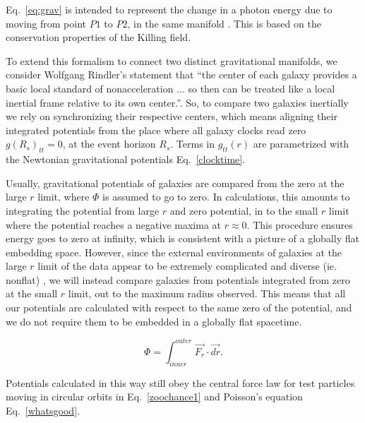 \documentclass[reprint,%
 amsmath,amssymb,
 aps,
]{revtex4-1}
\begin{document}
Eq.~\ref{eq:grav} is    intended to represent the change in a photon energy due to  moving from point $P1$ to $P2$,  in the same manifold \cite{Wald}.   This is based on the conservation properties of the Killing field. 


To  extend this formalism   to connect 
  two distinct gravitational manifolds, we consider  Wolfgang Rindler's statement that        ``the center of each galaxy provides a basic local standard of nonacceleration ... so then can be treated like a local inertial frame relative to its own center.''\cite{rindler2013essential}.
   So, to compare two   galaxies inertially  we rely on synchronizing their respective   centers, which means aligning their integrated potentials from the place where all galaxy clocks read zero   $g(R_s)_{tt} = 0$, at the event horizon $R_s$. 
   Terms in 
  $g_{tt}(r)$ are  parametrized with  the Newtonian  gravitational potentials   Eq.~\ref{clocktime}. 
  
 
   
 Usually, gravitational potentials of galaxies are compared from the zero at  the large $r$ limit,  where  $\Phi$ is assumed  to go to zero. 
 In calculations, this amounts to integrating the potential from large $r$ and  zero potential, in to the small $r$ limit where the potential reaches a negative maxima at   $r\approx 0$. 
This procedure  ensures   energy goes to zero at infinity, which is consistent with a picture of a globally flat embedding space.   However, since 
  the external environments of galaxies at the large $r$  limit of the data appear to be  extremely complicated  and diverse (ie. nonflat) \cite{Pomarede:2020pme,Hoffman:2017ako},   we will instead compare galaxies from potentials integrated from  zero at the   small $r$ limit, out to the maximum radius observed. This means that all our potentials are calculated with respect to the same zero of the potential, and we do not require them to be embedded in a globally flat spacetime.
   
 
  

 \begin{equation}
     \Phi  =    \int_{inner}^{outer} \vec{F_r}\cdot\vec{dr}.
      \label{eq:Newt2}
      \end{equation}
 
 

   
 Potentials calculated in this way still obey the central force law for test particles moving in circular orbits in Eq.~\ref{zoochance1} and Poisson's equation Eq.~\ref{whatsgood}.
   
\end{document}
